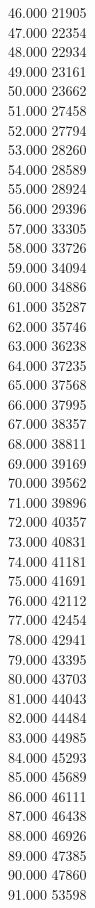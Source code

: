 { 46.000	21905 \\
 47.000	22354 \\
 48.000	22934 \\
 49.000	23161 \\
 50.000	23662 \\
 51.000	27458 \\
 52.000	27794 \\
 53.000	28260 \\
 54.000	28589 \\
 55.000	28924 \\
 56.000	29396 \\
 57.000	33305 \\
 58.000	33726 \\
 59.000	34094 \\
 60.000	34886 \\
 61.000	35287 \\
 62.000	35746 \\
 63.000	36238 \\
 64.000	37235 \\
 65.000	37568 \\
 66.000	37995 \\
 67.000	38357 \\
 68.000	38811 \\
 69.000	39169 \\
 70.000	39562 \\
 71.000	39896 \\
 72.000	40357 \\
 73.000	40831 \\
 74.000	41181 \\
 75.000	41691 \\
 76.000	42112 \\
 77.000	42454 \\
 78.000	42941 \\
 79.000	43395 \\
 80.000	43703 \\
 81.000	44043 \\
 82.000	44484 \\
 83.000	44985 \\
 84.000	45293 \\
 85.000	45689 \\
 86.000	46111 \\
 87.000	46438 \\
 88.000	46926 \\
 89.000	47385 \\
 90.000	47860 \\
 91.000	53598 \\
}
